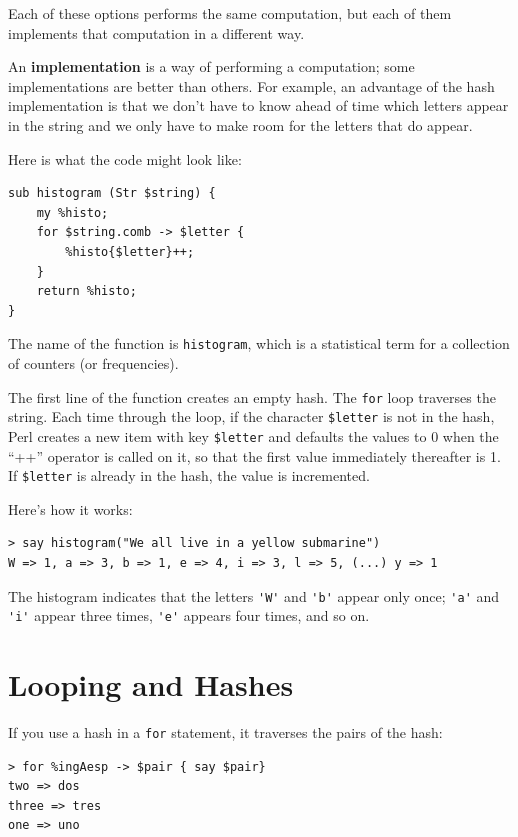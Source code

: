 Each of these options performs the same computation, but each
of them implements that computation in a different way.

An {\bf implementation} is a way of performing a computation;
some implementations are better than others.  For example,
an advantage of the hash implementation is that we don't
have to know ahead of time which letters appear in the string
and we only have to make room for the letters that do appear.

Here is what the code might look like:

\begin{verbatim}
sub histogram (Str $string) {
    my %histo;
    for $string.comb -> $letter {
        %histo{$letter}++;
    }
    return %histo;
}
\end{verbatim}
%
The name of the function is {\tt histogram}, which is a statistical
term for a collection of counters (or frequencies).

The first line of the
function creates an empty hash.  The {\tt for} loop traverses
the string.  Each time through the loop, if the character \verb'$letter' is
not in the hash, Perl creates a new item with key 
\verb'$letter' and defaults the values to 0 when the ``++'' 
operator is called on it, so that the first value immediately 
thereafter is 1.  If \verb'$letter'  is already in the hash,
the value is incremented.

Here's how it works:

\begin{verbatim}
> say histogram("We all live in a yellow submarine")
W => 1, a => 3, b => 1, e => 4, i => 3, l => 5, (...) y => 1
\end{verbatim}
%
The histogram indicates that the letters \verb"'W'" and 
\verb"'b'" appear only once; \verb"'a'" and \verb"'i'" 
appear three times, \verb"'e'" appears four times, and so on.

\section{Looping and Hashes}

If you use a hash in a {\tt for} statement, it traverses
the pairs of the hash:

\begin{verbatim}
> for %ingAesp -> $pair { say $pair}
two => dos
three => tres
one => uno
\end{verbatim}
%

